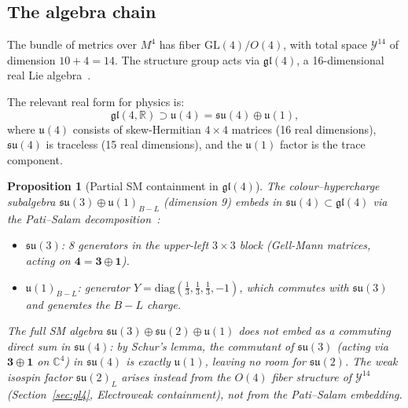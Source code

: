 \documentclass[11pt,a4paper]{article}
\theoremstyle{plain}
\newtheorem{proposition}[theorem]{Proposition}
\theoremstyle{definition}
\theoremstyle{remark}
\begin{document}
\subsection{The algebra chain}

The bundle of metrics over $M^4$ has fiber $\mathrm{GL}(4)/O(4)$, with total 
space $\mathcal{Y}^{14}$ of dimension $10 + 4 = 14$.  
The structure group acts via $\mathfrak{gl}(4)$, a 16-dimensional real Lie algebra~\cite{Dynkin1947}.

The relevant real form for physics is:
\begin{equation}
  \mathfrak{gl}(4,\mathbb{R}) \supset \mathfrak{u}(4) = \mathfrak{su}(4) \oplus \mathfrak{u}(1),
\end{equation}
where $\mathfrak{u}(4)$ consists of skew-Hermitian $4\times 4$ matrices (16 real 
dimensions), $\mathfrak{su}(4)$ is traceless (15 real dimensions), and the 
$\mathfrak{u}(1)$ factor is the trace component.

\begin{proposition}[Partial SM containment in $\mathfrak{gl}(4)$]\label{thm:SM-containment}
The colour--hypercharge subalgebra $\mathfrak{su}(3) \oplus \mathfrak{u}(1)_{B-L}$ 
(dimension 9) embeds in $\mathfrak{su}(4) \subset \mathfrak{gl}(4)$ via the 
Pati--Salam decomposition~\cite{PatiSalam1974}:
\begin{itemize}[noitemsep]
  \item $\mathfrak{su}(3)$: 8 generators in the upper-left $3\times 3$ block 
    (Gell-Mann matrices, acting on $\mathbf{4} = \mathbf{3} \oplus \mathbf{1}$).
  \item $\mathfrak{u}(1)_{B-L}$: generator $Y = \mathrm{diag}(\tfrac{1}{3},\tfrac{1}{3},\tfrac{1}{3},-1)$,
    which commutes with $\mathfrak{su}(3)$ and generates the $B-L$ charge.
\end{itemize}
The full SM algebra $\mathfrak{su}(3) \oplus \mathfrak{su}(2) \oplus \mathfrak{u}(1)$ does 
\emph{not} embed as a commuting direct sum in $\mathfrak{su}(4)$: by Schur's lemma, the 
commutant of $\mathfrak{su}(3)$ (acting via $\mathbf{3}\oplus\mathbf{1}$ on $\mathbb{C}^4$) 
in $\mathfrak{su}(4)$ is exactly $\mathfrak{u}(1)$, leaving no room for 
$\mathfrak{su}(2)$.  The weak isospin factor $\mathfrak{su}(2)_L$ arises instead from 
the $O(4)$ fiber structure of $\mathcal{Y}^{14}$ 
(Section~\ref{sec:gl4}, Electroweak containment), not from the Pati--Salam embedding.
\end{proposition}
\end{document}
